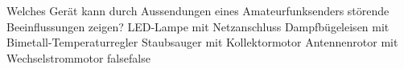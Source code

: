     {Welches Gerät kann durch Aussendungen eines Amateurfunksenders störende Beeinflussungen zeigen?}
    {LED-Lampe mit Netzanschluss}
    {Dampfbügeleisen mit Bimetall-Temperaturregler}
    {Staubsauger mit Kollektormotor}
    {Antennenrotor mit Wechselstrommotor}
    {false}{false}